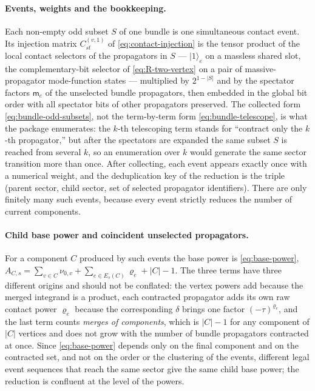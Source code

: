 \documentclass[11pt,a4paper]{article}
\begin{document}
\paragraph{Events, weights and the bookkeeping.}
Each non-empty odd subset $S$ of one bundle is one simultaneous contact event. Its injection matrix
$C^{(v,1)}_{st}$ of \eqref{eq:contact-injection} is the tensor product of the local contact
selectors of the propagators in $S$ --- $|1\rangle_e$ on a massless shared slot, the complementary-bit
selector of \eqref{eq:R-two-vertex} on a pair of massive-propagator mode-function states --- multiplied by $2^{1-|S|}$ and
by the spectator factors $\mathsf m_e$ of the unselected bundle propagators, then embedded in the global
bit order with all spectator bits of other propagators preserved. The collected form
\eqref{eq:bundle-odd-subsets}, not the term-by-term form \eqref{eq:bundle-telescope}, is what the
package enumerates: the $k$-th telescoping term stands for ``contract only the $k$-th propagator,'' but
after the spectators are expanded the same subset $S$ is reached from several $k$, so an
enumeration over $k$ would generate the same sector transition more than once. After collecting,
each event appears exactly once with a numerical weight, and the deduplication key of the reduction
is the triple (parent sector, child sector, set of selected propagator identifiers). There are only
finitely many such events, because every event strictly reduces the number of current components.

\paragraph{Child base power and coincident unselected propagators.}
For a component $C$ produced by such events the base power is \eqref{eq:base-power},
$A_{C,s}=\sum_{v\in C}\nu_{0,v}+\sum_{e\in E_s(C)}\varrho_e+|C|-1$. The three terms have three different
origins and should not be conflated: the vertex powers add because the merged integrand is a
product, each contracted propagator adds its own raw contact power $\varrho_e$ because the corresponding
$\delta$ brings one factor $(-\tau)^{\varrho_e}$, and the last term counts \emph{merges of components},
which is $|C|-1$ for any component of $|C|$ vertices and does not grow with the number of bundle
propagators contracted at once. Since \eqref{eq:base-power} depends only on the final component and on
the contracted set, and not on the order or the clustering of the events, different legal event
sequences that reach the same sector give the same child base power; the reduction is confluent at
the level of the powers.
\end{document}
